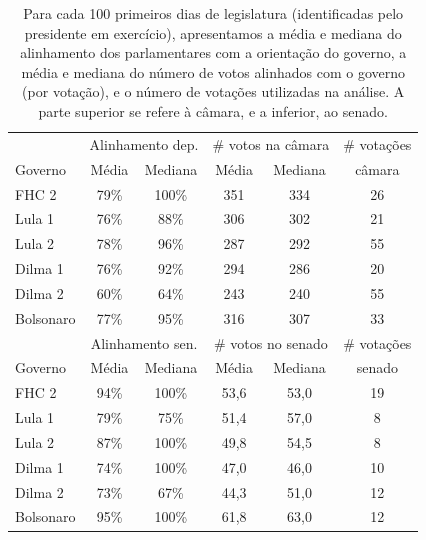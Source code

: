 \documentclass[12pt,a4paper]{article}
\begin{document}
\begin{table}[]
    \centering
    \caption{Para cada 100 primeiros dias de legislatura (identificadas pelo presidente em exercício), 
    apresentamos a média e mediana do alinhamento dos parlamentares com a orientação do governo, a média e mediana do número de votos alinhados com o governo (por votação), e o número de votações utilizadas na análise. A parte superior se refere à câmara, e a inferior, ao senado.}
    {\footnotesize
    \begin{tabular}{lccccc}
    \hline
 & \multicolumn{2}{c}{Alinhamento dep.} & \multicolumn{2}{c}{\# votos na câmara}   & \# votações \\
Governo & Média & Mediana & Média & Mediana & câmara \\
\hline
FHC 2 & 79\% & 100\% & 351 & 334 & 26 \\
Lula 1 & 76\% & 88\% & 306 & 302 & 21 \\
Lula 2 & 78\% & 96\% & 287 & 292 & 55 \\
Dilma 1 & 76\% & 92\% & 294 & 286 & 20 \\
Dilma 2 & 60\% & 64\% & 243 & 240 & 55 \\
Bolsonaro & 77\% & 95\% & 316 & 307 & 33 \\
\hline
& \multicolumn{2}{c}{Alinhamento sen.} & \multicolumn{2}{c}{\# votos no senado} & \# votações \\
Governo & Média  & Mediana & Média & Mediana & senado \\
\hline
FHC 2 & 94\% & 100\% & 53,6 & 53,0 & 19 \\
Lula 1 & 79\% & 75\% & 51,4 & 57,0 & 8 \\
Lula 2 & 87\% & 100\% & 49,8 & 54,5 & 8 \\
Dilma 1 & 74\% & 100\% & 47,0 & 46,0 & 10 \\
Dilma 2 & 73\% & 67\% & 44,3 & 51,0 & 12 \\
Bolsonaro & 95\% & 100\% & 61,8 & 63,0 & 12 \\
\hline
    \end{tabular}
    }
    \label{tab:apoio}
\end{table}
\end{document}
